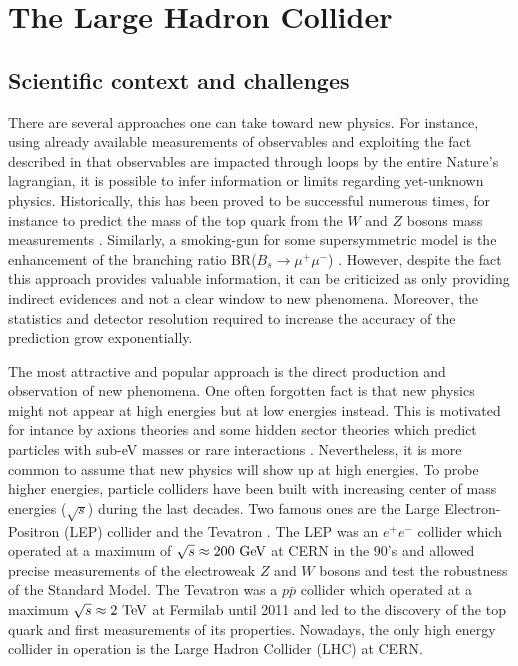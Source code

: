 


    \section{The Large Hadron Collider}

    \subsection{Scientific context and challenges}

    There are several approaches one can take toward new physics. For instance, using already
    available measurements of observables and exploiting the fact described in
     that observables are impacted through loops by
    the entire Nature's lagrangian, it is possible to infer information or limits regarding
    yet-unknown physics. Historically, this has been proved to be successful numerous times,
    for instance to predict the mass of the top quark from the $W$ and $Z$ bosons mass
    measurements \cite{discoveryOfTopQuark}. Similarly, a smoking-gun for some supersymmetric
    model is the enhancement of the branching ratio BR($B_s \rightarrow \mu^+\mu^-$)
    \cite{BsToMuMu}. However,
    despite the fact this approach provides valuable information, it can be criticized as
    only providing indirect evidences and not a clear window to new phenomena. Moreover,
    the statistics and detector resolution required to increase the accuracy of the
    prediction grow exponentially.

    The most attractive and popular approach is the direct production and observation of
    new phenomena. One often forgotten fact is that new physics might not appear at high
    energies but at low energies instead. This is motivated for intance by axions
    theories and some hidden sector theories which predict particles with sub-eV masses
    or rare interactions \cite{PolarizedHelium, CavityForHiddenPhotons}. Nevertheless, it
    is more common to assume that new physics will show up at high energies. To probe
    higher energies, particle colliders have been
    built with increasing center of mass energies ($\sqrt{s}$) during the last decades.
    Two famous ones are the Large Electron-Positron (LEP) collider \cite{LEP} and the
    Tevatron \cite{Tevatron}. The
    LEP was an $e^+e^-$ collider which operated at a maximum of $\sqrt{s} \approx 200~\text{GeV}$
    at CERN in the 90's and allowed precise measurements of the electroweak $Z$ and $W$
    bosons and test the robustness of the Standard Model. The Tevatron was a $p\bar{p}$
    collider which operated at a maximum $\sqrt{s} \approx 2~\text{TeV}$ at Fermilab until 2011
    and led to the discovery of the top quark and first measurements of its properties.
    Nowadays, the only high energy collider in operation is the Large Hadron Collider (LHC)
    at CERN.

